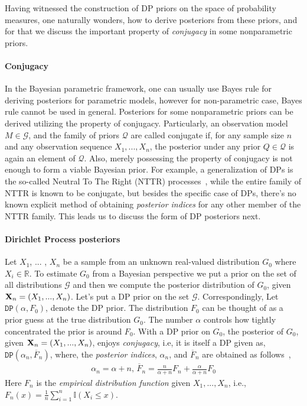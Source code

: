 \documentclass[10pt]{article}
\def\R{\mathbb{R}}
\newcommand{\DP}{\texttt{DP}}
\begin{document}
Having witnessed the construction of DP priors on the space of probability measures, one naturally wonders, how to derive posteriors from these priors, and for that we discuss the important property of \textit{conjugacy} in some nonparametric priors.

\paragraph{Conjugacy} In the Bayesian parametric framework, one can usually use Bayes rule for deriving posteriors for parametric models, however for non-parametric case, Bayes rule cannot be used in general. Posteriors for some nonparametric priors can be derived utilizing the property of conjugacy. Particularly, an observation model $M \in \mathcal{G}$, and the family of priors $\mathcal{Q}$ are called conjugate if, for any sample size $n$ and any observation sequence $X_{1}, . . ., X_{n}$, the posterior under any prior $Q\in \mathcal{Q}$ is again an element of $\mathcal{Q}$. Also, merely possessing the property of conjugacy is not enough to form a viable Bayesian prior.  For example, a generalization of DPs is the so-called Neutral To The Right (NTTR) processes~\citep{lijoi2010models}, while the entire family of NTTR is  known to be conjugate, but besides the specific case of DPs, there's no known explicit method of obtaining \textit{posterior indices} for any other member of the NTTR family. This leads us to discuss the form of DP posteriors next.

\paragraph{Dirichlet Process posteriors} Let $X_1$, ... , $X_n$ be a sample from an unknown real-valued distribution $G_{0}$ where $X_i \in \R$. To estimate $G_{0}$ from a Bayesian perspective  we put a prior on the set of all distributions $\mathcal{G}$ and then we compute the posterior distribution of $G_{0}$, given ${\bf X}_n = (X_1, . . . , X_n)$. Let's put a DP prior   on the set $\mathcal{G}$. Correspondingly, Let $\DP(\alpha,F_{0})$, denote the DP prior. The distribution $F_{0}$ can be thought of as a prior guess at the true distribution $G_{0}$. The
number $\alpha$ controls how tightly concentrated the prior is around $F_0$.  With a DP prior on $G_{0}$, the posterior of $G_{0}$, given ${\bf X}_n = (X_1, . . . , X_n)$, enjoys \textit{conjugacy}, i.e, it is itself a DP given as, $\DP(\alpha_{n},\overline{F}_n)$, where, the \textit{posterior indices}, $\alpha_{n}$, and $\overline{F}_{n}$ are obtained as follows~\citep{ferguson1973bayesian,ghosal2010dirichlet},
\begin{align} \label{def:DP-posteriors}
\alpha_{n} = \alpha + n, \, \overline{F}_n = \frac{n}{\alpha+n}{F}_n + \frac{\alpha}{\alpha+n}F_0 
\end{align}
\noindent Here ${F}_n$ is the \textit{empirical  distribution function} given $X_1,. . .,X_{n}$, i.e., $F_{n}(x) = \frac{1}{n}\sum_{i=1}^{n}\mathbb{I}(X_{i} \le x)$. 
\end{document}
